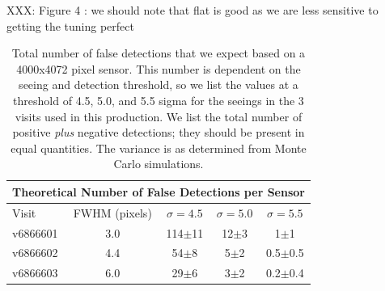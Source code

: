 \documentclass[prd, nofootinbib, floatfix, 11pt,tightenlines,times]{article}
\begin{document}
{XXX: Figure 4 : we should note that flat is good as we are less
  sensitive to getting the tuning perfect\\

\clearpage



\clearpage

\begin{table}
\centering
\begin{tabular}{lcccc}
\hline
\multicolumn{5}{|c|}{Theoretical Number of False Detections per Sensor} \\
\hline
Visit    & FWHM (pixels) & $\sigma=4.5$ & $\sigma=5.0$ & $\sigma=5.5$\\
\hline
v6866601 & 3.0 & 114$\pm$11 & 12$\pm$3& 1$\pm$1\\
v6866602 & 4.4 & 54$\pm$8 & 5$\pm$2& 0.5$\pm$0.5\\
v6866603 & 6.0 & 29$\pm$6 & 3$\pm$2&0.2$\pm$0.4\\
\end{tabular}
\caption{Total number of false detections that we expect based on a
  4000x4072 pixel sensor.  This number is dependent on the seeing and
  detection threshold, so we list the values at a threshold of 4.5,
  5.0, and 5.5 sigma for the seeings in the 3 visits used in this
  production. We list the total number of positive {\it plus} negative
  detections; they should be present in equal quantities. The variance
  is as determined from Monte Carlo simulations.\label{tab-fp} }
\end{table}



}
\end{document}
